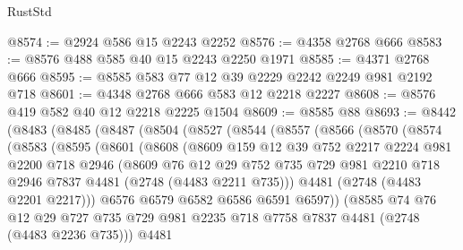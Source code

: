 \begin{lexlean}{RustStd}
\begin{coremodule}
@8574 := @2924 @586 @15 @2243 @2252
@8576 := @4358 @2768 @666
@8583 := @8576 @488 @585 @40 @15 @2243 @2250 @1971
@8585 := @4371 @2768 @666
@8595 := @8585 @583 @77 @12 @39 @2229 @2242 @2249 @981 @2192 @718
@8601 := @4348 @2768 @666 @583 @12 @2218 @2227
@8608 := @8576 @419 @582 @40 @12 @2218 @2225 @1504
@8609 := @8585 @88
@8693 := @8442
    (@8483
      (@8485
        (@8487
          (@8504
            (@8527
              (@8544
                (@8557
                  (@8566
                    (@8570
                      (@8574
                        (@8583
                          (@8595
                            (@8601
                              (@8608
                                (@8609
                                  @159
                                  @12
                                  @39
                                  @752
                                  @2217
                                  @2224
                                  @981
                                  @2200
                                  @718
                                  @2946
                                  (@8609
                                    @76
                                    @12
                                    @29
                                    @752
                                    @735
                                    @729
                                    @981
                                    @2210
                                    @718
                                    @2946
                                    @7837
                                    @4481
                                    (@2748 (@4483 @2211 @735)))
                                  @4481
                                  (@2748 (@4483 @2201 @2217)))
                                @6576
                                @6579
                                @6582
                                @6586
                                @6591
                                @6597))
                            (@8585
                              @74
                              @76
                              @12
                              @29
                              @727
                              @735
                              @729
                              @981
                              @2235
                              @718
                              @7758
                              @7837
                              @4481
                              (@2748 (@4483 @2236 @735)))
                            @4481

\end{coremodule}
\end{lexlean}
